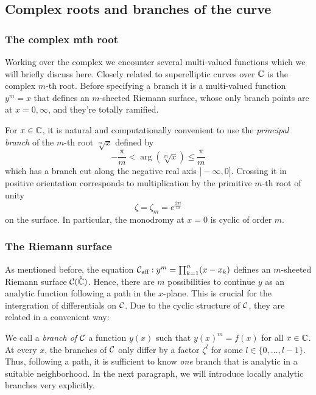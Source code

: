 \documentclass[main.tex]{subfiles}
\begin{document}
  \subsection{Complex roots and branches of the curve}\label{subsec:roots_branches}

  \subsubsection{The complex mth root}

  Working over the complex we encounter several multi-valued functions
  which we will briefly discuss here.  Closely related to superelliptic
  curves over $\mathbb{C}$ is the complex $m$-th root.
  Before specifying a branch it is a multi-valued function $y^m = x$
  that defines an $m$-sheeted Riemann surface, whose only branch points
  are at $x = 0,\infty$, and they're totally ramified.

  For $x\in\mathbb{C}$, it is natural and computationally convenient to use the
  \emph{principal branch} of the $m$-th root $\sqrt[m]x$ defined by
  \begin{equation}
      \label{eq:principal_mth_root}
      -\frac{π}m<\arg(\sqrt[m]x)\leq\frac{π}m
  \end{equation}
  which has a branch cut along the negative real axis $]\!-\infty,0]$.
  Crossing it in positive orientation corresponds to multiplication by
  the primitive $m$-th root of unity
  \begin{equation}
      \label{eq:zeta}
  \zeta = \zeta_m = e^{\frac{2\pi i }{m}}
  \end{equation}
  on the surface. In
  particular, the monodromy at $x=0$ is cyclic of order $m$.

  \subsubsection{The Riemann surface}

  As mentioned before, the equation $\mathcal{C}_{\text{aff}} : y^m = \prod_{k = 1}^n (x - x_k)$ defines an $m$-sheeted Riemann surface $\mathcal{C}(\hat{\mathbb{C}})$. 
  Hence, there
  are $m$ possibilities to continue $y$ as an analytic function following a path in the $x$-plane. This is crucial for the intergration
  of differentials on $\mathcal{C}$. Due to the cyclic structure of $\mathcal{C}$, they are related in a convenient way:
  
  We call a \emph{branch of $\mathcal{C}$} a function $y(x)$ such that
  $y(x)^m = f(x)$ for all $x \in \mathbb{C}$. At every $x$, the branches of $\mathcal{C}$ only
  differ by a factor $\zeta^l$ for some $l \in \{0,\dots,l-1\}$. Thus, following a path, it is sufficient to know \emph{one} branch that is analytic in a suitable neighborhood. In the
  next paragraph, we will introduce locally analytic branches very explicitly.
  
\end{document}
